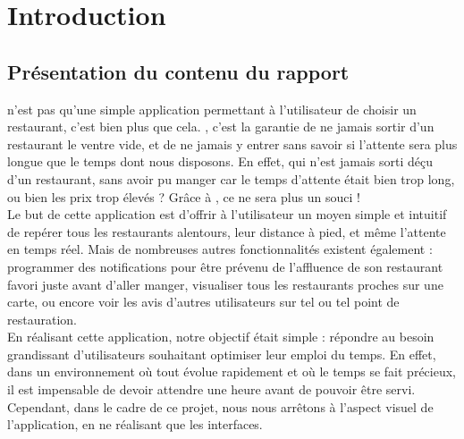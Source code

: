 





\newpage
\tableofcontents
{%
\let\oldnumberline\numberline%
\renewcommand{\numberline}{\figurename~\oldnumberline}%
\renewcommand\listfigurename{Liste des figures}
\listoffigures%
}
{%
\let\oldnumberline\numberline%
\renewcommand{\numberline}{\tablename~\oldnumberline}%
\renewcommand\listtablename{Liste des tableaux}
\listoftables%
}

\newpage
{}
\chapter*{Introduction}
\section*{Présentation du contenu du rapport}

\appname n'est pas qu'une simple application permettant à l'utilisateur de choisir un restaurant, c'est bien plus que cela. \appname, c'est la garantie de ne jamais sortir d'un restaurant le ventre vide, et de ne jamais y entrer sans savoir si l'attente sera plus longue que le temps dont nous disposons. En effet, qui n'est jamais sorti déçu d'un restaurant, sans avoir pu manger car le temps d'attente était bien trop long, ou bien les prix trop élevés ? Grâce à \appname, ce ne sera plus un souci !\\
Le but de cette application est d'offrir à l'utilisateur un moyen simple et intuitif de repérer tous les restaurants alentours, leur distance à pied, et même l'attente en temps réel. Mais de nombreuses autres fonctionnalités existent également : programmer des notifications pour être prévenu de l'affluence de son restaurant favori juste avant d'aller manger, visualiser tous les restaurants proches sur une carte, ou encore voir les avis d'autres utilisateurs sur tel ou tel point de restauration.\\
En réalisant cette application, notre objectif était simple : répondre au besoin grandissant d'utilisateurs souhaitant optimiser leur emploi du temps. En effet, dans un environnement où tout évolue rapidement et où le temps se fait précieux, il est impensable de devoir attendre une heure avant de pouvoir être servi. Cependant, dans le cadre de ce projet, nous nous arrêtons à l'aspect visuel de l'application, en ne réalisant que les interfaces.

